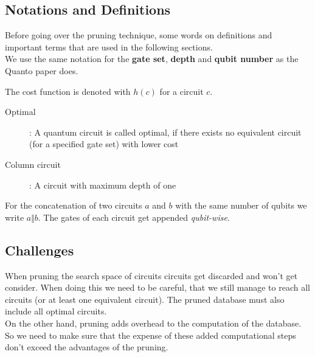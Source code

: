 \subsection{Notations and Definitions}
Before going over the pruning technique, some words on definitions and important terms that are used in the following sections.\\

We use the same notation for the \textbf{gate set}, \textbf{depth} and \textbf{qubit number} as the Quanto paper does.


The cost function is denoted with $h(c)$ for a circuit $c$.

\begin{description}
	\item[Optimal]: A quantum circuit is called optimal, if there exists no equivalent circuit (for a specified gate set) with lower cost
	
	\item[Column circuit]: A circuit with maximum depth of one
\end{description}

For the concatenation of two circuits $a$ and $b$ with the same number of qubits we write $a\Vert b$. The gates of each circuit get appended \textit{qubit-wise}.


\subsection{Challenges}
When pruning the search space of circuits circuits get discarded and won't get consider. When doing this we need to be careful, that we still manage to reach all circuits 
(or at least one equivalent circuit). The pruned database must also include all optimal circuits.\\

On the other hand, pruning adds overhead to the computation of the database. So we need to make sure that the expense of these added computational steps don't exceed the advantages of the pruning.\\

